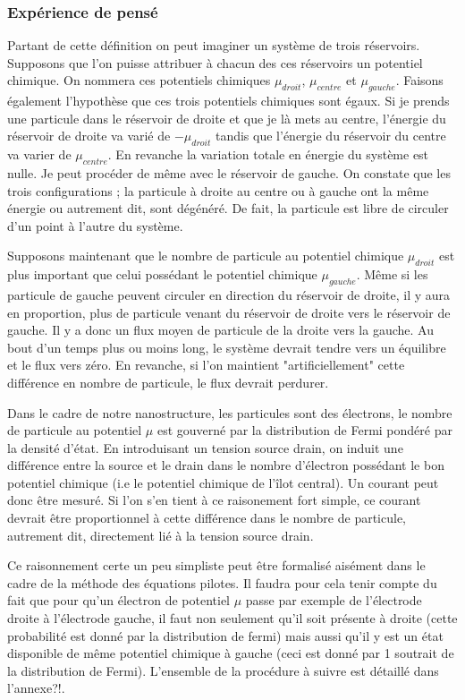\subsubsection{Expérience de pensé}
Partant de cette définition on peut imaginer un système de trois réservoirs. Supposons que l'on puisse attribuer à chacun des ces réservoirs un potentiel chimique. On nommera ces potentiels chimiques $\mu_{droit}$, $\mu_{centre}$ et $\mu_{gauche}$. Faisons également l'hypothèse que ces trois potentiels chimiques sont égaux. Si je prends une particule dans le réservoir de droite et que je là mets au centre, l'énergie du réservoir de droite va varié de $-\mu_{droit}$ tandis que l'énergie du réservoir du centre va varier de $\mu_{centre}$. En revanche la variation totale en énergie du système est nulle. Je peut procéder de m\^eme avec le réservoir de gauche. On constate que les trois configurations ; la particule à droite au centre ou à gauche ont la m\^eme énergie ou autrement dit, sont dégénéré. De fait, la particule est libre de circuler d'un point à l'autre du système. 


Supposons maintenant que le nombre de particule au potentiel chimique $\mu_{droit}$ est plus important que celui possédant le potentiel chimique $\mu_{gauche}$. M\^eme si les particule de gauche peuvent circuler en direction du réservoir de droite, il y aura en proportion, plus de particule venant du réservoir de droite vers le réservoir de gauche. Il y a donc un flux moyen de particule de la droite vers la gauche. Au bout d'un temps plus ou moins long, le système devrait tendre vers un équilibre et le flux vers zéro. En revanche, si l'on maintient "artificiellement" cette différence en nombre de particule, le flux devrait perdurer.

Dans le cadre de notre nanostructure, les particules sont des électrons, le nombre de particule au potentiel $\mu$ est gouverné par la distribution de Fermi pondéré par la densité d'état. En introduisant un tension source drain, on induit une différence entre la source et le drain dans le nombre d'électron possédant le bon potentiel chimique (i.e le potentiel chimique de l'\^ilot central). Un courant peut donc \^etre mesuré. Si l'on s'en tient à ce raisonement fort simple, ce courant devrait \^etre proportionnel à cette différence dans le nombre de particule, autrement dit, directement lié à la tension source drain.

Ce raisonnement certe un peu simpliste peut \^etre formalisé aisément dans le cadre de la méthode des équations pilotes. Il faudra pour cela tenir compte du fait que pour qu'un électron de potentiel $\mu$ passe par exemple de l'électrode droite à l'électrode gauche, il faut non seulement qu'il soit présente à droite (cette probabilité est donné par la distribution de fermi) mais aussi qu'il y est un état disponible de m\^eme potentiel chimique à gauche (ceci est donné par 1 soutrait de la distribution de Fermi). L'ensemble de la procédure à suivre est détaillé dans l'annexe?!.

